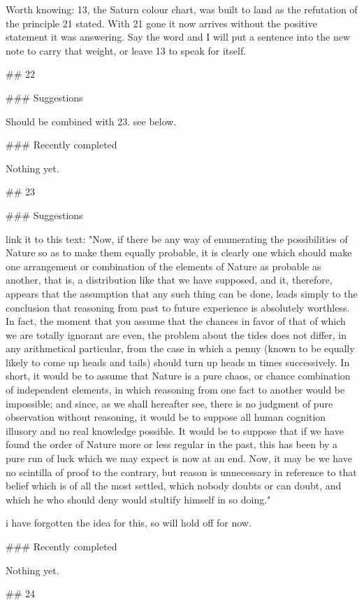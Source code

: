 Worth knowing: 13, the Saturn colour chart, was built to land as the refutation
of the principle 21 stated. With 21 gone it now arrives without the positive
statement it was answering. Say the word and I will put a sentence into the new
note to carry that weight, or leave 13 to speak for itself.


## 22

### Suggestions

Should be combined with 23. see below.

### Recently completed

Nothing yet.


## 23

### Suggestions

link it to this text:
"Now, if there be any way of enumerating the possibilities of Nature so as to make them equally probable, it is clearly one which should make one arrangement or combination of the elements of Nature as probable as another, that is, a distribution like that we have supposed, and it, therefore, appears that the assumption that any such thing can be done, leads simply to the conclusion that reasoning from past to future experience is absolutely worthless. In fact, the moment that you assume that the chances in favor of that of which we are totally ignorant are even, the problem about the tides does not differ, in any arithmetical particular, from the case in which a penny (known to be equally likely to come up heads and tails) should turn up heads m times successively. In short, it would be to assume that Nature is a pure chaos, or chance combination of independent elements, in which reasoning from one fact to another would be impossible; and since, as we shall hereafter see, there is no judgment of pure observation without reasoning, it would be to suppose all human cognition illusory and no real knowledge possible. It would be to suppose that if we have found the order of Nature more or less regular in the past, this has been by a pure run of luck which we may expect is now at an end. Now, it may be we have no scintilla of proof to the contrary, but reason is unnecessary in reference to that belief which is of all the most settled, which nobody doubts or can doubt, and which he who should deny would stultify himself in so doing."

i have forgotten the idea for this, so will hold off for now.

### Recently completed

Nothing yet.


## 24

